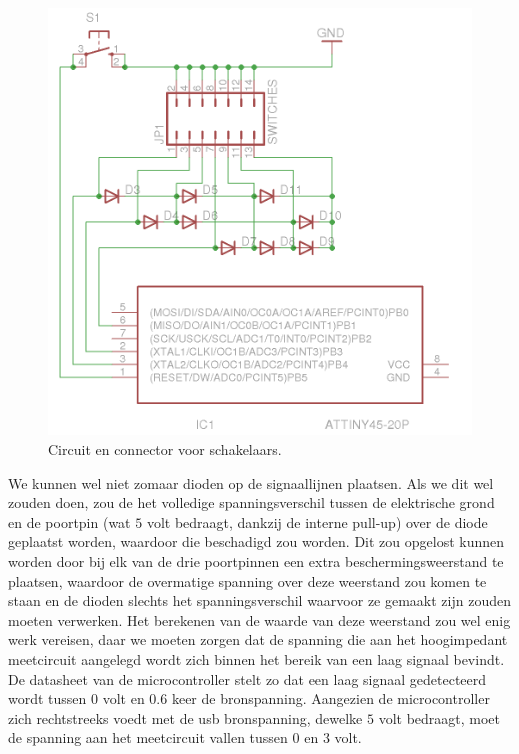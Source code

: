 \begin{figure}
	\includegraphics[width=\textwidth]{afbeeldingen/inputmodule_schakelaars}
	\caption{Circuit en connector voor schakelaars.}
\end{figure}

We kunnen wel niet zomaar dioden op de signaallijnen plaatsen. Als we dit wel zouden doen, zou de het volledige spanningsverschil tussen de elektrische grond en de poortpin (wat $5$ volt bedraagt, dankzij de interne pull-up) over de diode geplaatst worden, waardoor die beschadigd zou worden. Dit zou opgelost kunnen worden door bij elk van de drie poortpinnen een extra beschermingsweerstand te plaatsen, waardoor de overmatige spanning over deze weerstand zou komen te staan en de dioden slechts het spanningsverschil waarvoor ze gemaakt zijn zouden moeten verwerken. Het berekenen van de waarde van deze weerstand zou wel enig werk vereisen, daar we moeten zorgen dat de spanning die aan het hoogimpedant meetcircuit aangelegd wordt zich binnen het bereik van een laag signaal bevindt. De datasheet van de microcontroller stelt zo dat een laag signaal gedetecteerd wordt tussen $0$ volt en $0.6$ keer de bronspanning. Aangezien de microcontroller zich rechtstreeks voedt met de \ac{usb} bronspanning, dewelke $5$ volt bedraagt, moet de spanning aan het meetcircuit vallen tussen $0$ en $3$ volt.

